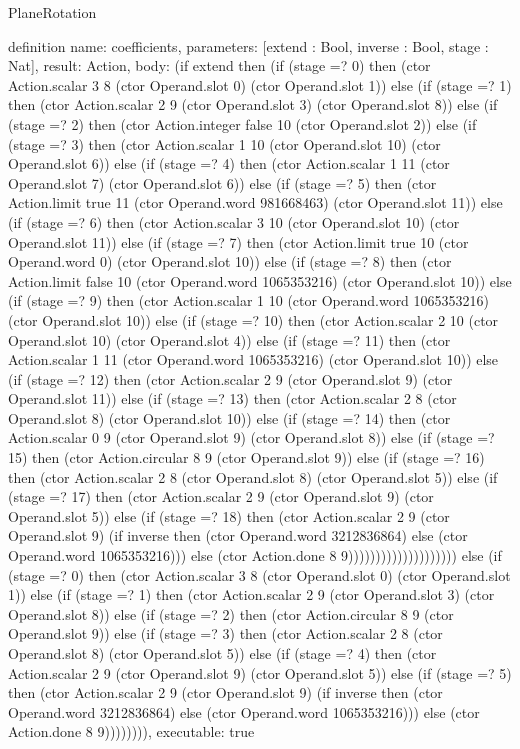 \begin{lexlean}{PlaneRotation}
\begin{semanticmodule}
definition{
  name: coefficients,
  parameters: [extend : Bool, inverse : Bool, stage : Nat],
  result: Action,
  body: (if extend then (if (stage =? 0) then (ctor Action.scalar 3 8 (ctor Operand.slot 0) (ctor Operand.slot 1)) else (if (stage =? 1) then (ctor Action.scalar 2 9 (ctor Operand.slot 3) (ctor Operand.slot 8)) else (if (stage =? 2) then (ctor Action.integer false 10 (ctor Operand.slot 2)) else (if (stage =? 3) then (ctor Action.scalar 1 10 (ctor Operand.slot 10) (ctor Operand.slot 6)) else (if (stage =? 4) then (ctor Action.scalar 1 11 (ctor Operand.slot 7) (ctor Operand.slot 6)) else (if (stage =? 5) then (ctor Action.limit true 11 (ctor Operand.word 981668463) (ctor Operand.slot 11)) else (if (stage =? 6) then (ctor Action.scalar 3 10 (ctor Operand.slot 10) (ctor Operand.slot 11)) else (if (stage =? 7) then (ctor Action.limit true 10 (ctor Operand.word 0) (ctor Operand.slot 10)) else (if (stage =? 8) then (ctor Action.limit false 10 (ctor Operand.word 1065353216) (ctor Operand.slot 10)) else (if (stage =? 9) then (ctor Action.scalar 1 10 (ctor Operand.word 1065353216) (ctor Operand.slot 10)) else (if (stage =? 10) then (ctor Action.scalar 2 10 (ctor Operand.slot 10) (ctor Operand.slot 4)) else (if (stage =? 11) then (ctor Action.scalar 1 11 (ctor Operand.word 1065353216) (ctor Operand.slot 10)) else (if (stage =? 12) then (ctor Action.scalar 2 9 (ctor Operand.slot 9) (ctor Operand.slot 11)) else (if (stage =? 13) then (ctor Action.scalar 2 8 (ctor Operand.slot 8) (ctor Operand.slot 10)) else (if (stage =? 14) then (ctor Action.scalar 0 9 (ctor Operand.slot 9) (ctor Operand.slot 8)) else (if (stage =? 15) then (ctor Action.circular 8 9 (ctor Operand.slot 9)) else (if (stage =? 16) then (ctor Action.scalar 2 8 (ctor Operand.slot 8) (ctor Operand.slot 5)) else (if (stage =? 17) then (ctor Action.scalar 2 9 (ctor Operand.slot 9) (ctor Operand.slot 5)) else (if (stage =? 18) then (ctor Action.scalar 2 9 (ctor Operand.slot 9) (if inverse then (ctor Operand.word 3212836864) else (ctor Operand.word 1065353216))) else (ctor Action.done 8 9)))))))))))))))))))) else (if (stage =? 0) then (ctor Action.scalar 3 8 (ctor Operand.slot 0) (ctor Operand.slot 1)) else (if (stage =? 1) then (ctor Action.scalar 2 9 (ctor Operand.slot 3) (ctor Operand.slot 8)) else (if (stage =? 2) then (ctor Action.circular 8 9 (ctor Operand.slot 9)) else (if (stage =? 3) then (ctor Action.scalar 2 8 (ctor Operand.slot 8) (ctor Operand.slot 5)) else (if (stage =? 4) then (ctor Action.scalar 2 9 (ctor Operand.slot 9) (ctor Operand.slot 5)) else (if (stage =? 5) then (ctor Action.scalar 2 9 (ctor Operand.slot 9) (if inverse then (ctor Operand.word 3212836864) else (ctor Operand.word 1065353216))) else (ctor Action.done 8 9)))))))),
  executable: true
}


\end{semanticmodule}
\end{lexlean}
